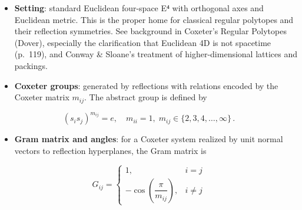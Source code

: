 \documentclass[
  10pt,
]{article}
\providecommand{\tightlist}{%
  \setlength{\itemsep}{0pt}\setlength{\parskip}{0pt}}
\begin{document}
\begin{itemize}
\tightlist
\item
  \textbf{Setting}: standard Euclidean four-space E⁴ with orthogonal
  axes and Euclidean metric. This is the proper home for classical
  regular polytopes and their reflection symmetries. See background in
  Coxeter's Regular Polytopes (Dover), especially the clarification that
  Euclidean 4D is not spacetime (p.~119), and Conway \& Sloane's
  treatment of higher-dimensional lattices and packings.
\item
  \textbf{Coxeter groups}: generated by reflections with relations
  encoded by the Coxeter matrix \(m_{ij}\). The abstract group is
  defined by
\end{itemize}

\begin{equation}\label{eq:coxeter_relations}
(s_i s_j)^{m_{ij}} = e,\quad m_{ii}=1,\; m_{ij}\in\{2,3,4,\ldots,\infty\}\,.
\end{equation}

\begin{itemize}
\tightlist
\item
  \textbf{Gram matrix and angles}: for a Coxeter system realized by unit
  normal vectors to reflection hyperplanes, the Gram matrix is
\end{itemize}

\begin{equation}\label{eq:coxeter_gram}
G_{ij} = \begin{cases}
1, & i=j \\
-\cos\!\left(\dfrac{\pi}{m_{ij}}\right), & i\ne j
\end{cases}
\end{equation}
\end{document}
